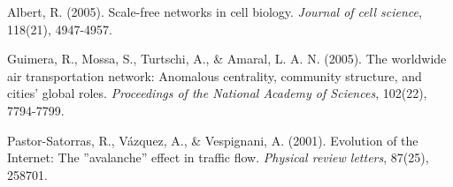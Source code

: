 \begin{thebibliography}{9}
Albert, R. (2005). Scale-free networks in cell biology. \textit{Journal of cell science}, 118(21), 4947-4957.

Guimera, R., Mossa, S., Turtschi, A., \& Amaral, L. A. N. (2005). The worldwide air transportation network: Anomalous centrality, community structure, and cities' global roles. \textit{Proceedings of the National Academy of Sciences}, 102(22), 7794-7799.

Pastor-Satorras, R., Vázquez, A., \& Vespignani, A. (2001). Evolution of the Internet: The ''avalanche'' effect in traffic flow. \textit{Physical review letters}, 87(25), 258701.

\end{thebibliography}